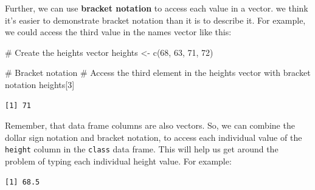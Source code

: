 \documentclass[
  letterpaper,
  DIV=11,
  numbers=noendperiod]{scrreprt}
\newenvironment{Shaded}{\begin{snugshade}}{\end{snugshade}}
\newcommand{\CommentTok}[1]{\textcolor[rgb]{0.37,0.37,0.37}{#1}}
\newcommand{\DecValTok}[1]{\textcolor[rgb]{0.68,0.00,0.00}{#1}}
\newcommand{\FunctionTok}[1]{\textcolor[rgb]{0.28,0.35,0.67}{#1}}
\newcommand{\NormalTok}[1]{\textcolor[rgb]{0.00,0.23,0.31}{#1}}
\newcommand{\OtherTok}[1]{\textcolor[rgb]{0.00,0.23,0.31}{#1}}
\newcommand{\SpecialCharTok}[1]{\textcolor[rgb]{0.37,0.37,0.37}{#1}}
\begin{document}
Further, we can use \textbf{bracket notation} to access each value in a
vector. we think it's easier to demonstrate bracket notation than it is
to describe it. For example, we could access the third value in the
names vector like this:

\begin{Shaded}
\begin{Highlighting}[]
\CommentTok{\# Create the heights vector}
\NormalTok{heights }\OtherTok{\textless{}{-}} \FunctionTok{c}\NormalTok{(}\DecValTok{68}\NormalTok{, }\DecValTok{63}\NormalTok{, }\DecValTok{71}\NormalTok{, }\DecValTok{72}\NormalTok{)}

\CommentTok{\# Bracket notation}
\CommentTok{\# Access the third element in the heights vector with bracket notation}
\NormalTok{heights[}\DecValTok{3}\NormalTok{]}
\end{Highlighting}
\end{Shaded}

\begin{verbatim}
[1] 71
\end{verbatim}

Remember, that data frame columns are also vectors. So, we can combine
the dollar sign notation and bracket notation, to access each individual
value of the \texttt{height} column in the \texttt{class} data frame.
This will help us get around the problem of typing each individual
height value. For example:

\begin{Shaded}
\end{Shaded}

\begin{verbatim}
[1] 68.5
\end{verbatim}
\end{document}
